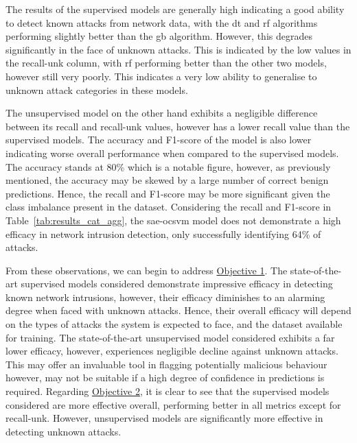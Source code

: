 The results of the supervised models are generally high indicating a good
ability to detect known attacks from network data, with the \gls{dt} and
\gls{rf} algorithms performing slightly better than the \gls{gb} algorithm.
However, this degrades significantly in the face of unknown attacks. This is
indicated by the low values in the recall-unk column, with \gls{rf} performing
better than the other two models, however still very poorly. This indicates a
very low ability to generalise to unknown attack categories in these models.

The unsupervised model on the other hand exhibits a negligible difference
between its recall and recall-unk values, however has a lower recall value than
the supervised models. The accuracy and F1-score of the model is also lower
indicating worse overall performance when compared to the supervised models.
The accuracy stands at 80\% which is a notable figure, however, as previously
mentioned, the accuracy may be skewed by a large number of correct benign
predictions. Hence, the recall and F1-score may be more significant given the
class imbalance present in the dataset. Considering the recall and F1-score in
Table~\ref{tab:results_cat_agg}, the \gls{sae}-\gls{ocsvm} model does not
demonstrate a high efficacy in network intrusion detection, only successfully
identifying 64\% of attacks.

From these observations, we can begin to address \hyperlink{obj1}{Objective 1}.
The state-of-the-art supervised models considered demonstrate impressive
efficacy in detecting known network intrusions, however, their efficacy
diminishes to an alarming degree when faced with unknown attacks. Hence, their
overall efficacy will depend on the types of attacks the system is expected to
face, and the dataset available for training. The state-of-the-art unsupervised
model considered exhibits a far lower efficacy, however, experiences negligible
decline against unknown attacks. This may offer an invaluable tool in flagging
potentially malicious behaviour however, may not be suitable if a high degree
of confidence in predictions is required. Regarding \hyperlink{obj2}{Objective
    2}, it is clear to see that the supervised models considered are more effective
overall, performing better in all metrics except for recall-unk. However,
unsupervised models are significantly more effective in detecting unknown
attacks.

